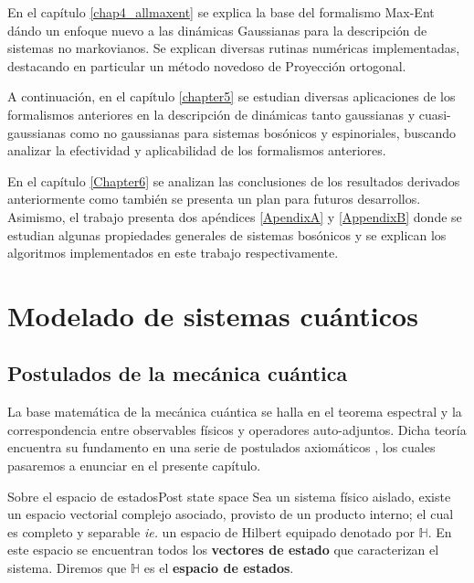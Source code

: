 \documentclass{report} %
\newcommand{\ie}{\textit{ie. }}
\numberwithin{equation}{section}
\begin{document}
En el capítulo \ref{chap4_allmaxent} se explica la base del formalismo Max-Ent dándo un enfoque nuevo a las dinámicas Gaussianas para la descripción de sistemas no markovianos. Se explican diversas rutinas numéricas implementadas, destacando en particular un método novedoso de Proyección ortogonal. 

A continuación, en el capítulo \ref{chapter5}
se estudian diversas aplicaciones de los formalismos anteriores en la descripción de dinámicas tanto gaussianas y cuasi-gaussianas como no gaussianas para sistemas bosónicos y espinoriales, buscando analizar la efectividad y aplicabilidad de los formalismos anteriores. 

En el capítulo \ref{Chapter6} se analizan las conclusiones de los resultados derivados anteriormente como también se presenta un plan para futuros desarrollos. Asimismo, el trabajo presenta dos apéndices \ref{ApendixA} y \ref{AppendixB} donde se estudian algunas propiedades generales de sistemas bosónicos y se explican los algoritmos implementados en este trabajo respectivamente. 

\newpage

\chapter{Modelado de sistemas cu\'anticos }
\label{chapter2}

\section{Postulados de la mec\'anica cu\'antica}

La base matemática de la mecánica cuántica se halla en el teorema espectral  \cite{HoracioI,HeinzPetruccione,BCHallp} y la correspondencia entre observables físicos y operadores auto-adjuntos. Dicha teoría encuentra su fundamento en una serie de postulados axiomáticos \cite{CohenTannoudji1989, Nielsen.00, HeinzPetruccione, Portesi-ECI34, Holik-ECI34}, los cuales pasaremos a enunciar en el presente capítulo.

\begin{post}{Sobre el espacio de estados}{Post state space}
Sea un sistema físico aislado, existe un espacio vectorial complejo asociado, provisto de un producto interno; el cual es completo y separable \ie un espacio de Hilbert equipado \cite{Nielsen.00, NakaharaM} denotado por $\mathbb{H}$. En este espacio se encuentran todos los \textbf{vectores de estado} que caracterizan el sistema. Diremos que $\mathbb{H}$ es el \textbf{espacio de estados}. 
\label{Post state space}
\end{post}
\end{document}
